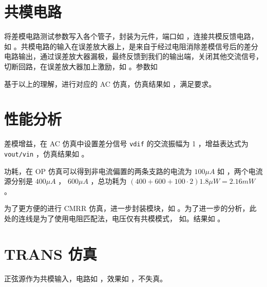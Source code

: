 \documentclass[lang=cn,11pt,a4paper,cite=authoryear]{elegantpaper}
\begin{document}

\section{共模电路}

将差模电路测试参数写入各个管子，封装为元件，端口如  ，连接共模反馈电路，如  。共模电路的输入在误差放大器上，是来自于经过电阻消除差模信号后的差分电路输出，通过误差放大器漏极，最终反馈到我们的输出端，关闭其他交流信号，切断回路，在误差放大器加上激励，如 。参数如 




基于以上的理解，进行对应的 AC 仿真，仿真结果如  ，满足要求。


\section{性能分析}

差模增益，在 AC 仿真中设置差分信号 \lstinline{vdif} 的交流振幅为 1 ，增益表达式为 \lstinline{vout/vin} ，仿真结果如  。


功耗，在 OP 仿真可以得到非电流偏置的两条支路的电流为 \(100 \mu A\) 如 ，两个电流源分别是 \(400\mu A\) ， \(600 \mu A\) ，总功耗为 \((400 + 600 + 100 \cdot 2) 1.8 \mu W = 2.16 mW\) 。


为了更方便的进行 CMRR 仿真，进一步封装模块，如  。为了进一步的分析，此处的连线是为了使用电阻匹配法，电压仅有共模模式， 如。结果如  。




\section{TRANS 仿真}

正弦源作为共模输入，电路如  ，效果如  ，不失真。
\end{document}
